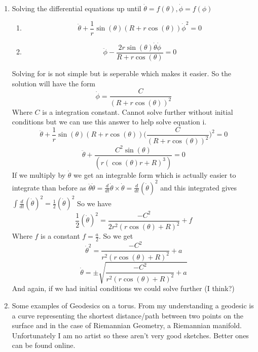 \documentclass[12pt]{article}
\begin{document}
\begin{enumerate}
\begin{enumerate}
\item Solving the differential equations up until $\dot{\theta} = f(\theta), \dot{\phi} = f(\phi)$
\begin{enumerate}
  \item $$ \ddot{\theta} + \frac{1}{r} \sin(\theta) ( R+ r \cos(\theta)) \dot{\phi}^2 = 0 $$
  \item $$ \ddot{\phi} - \frac{ 2 r \sin(\theta) \dot{\theta} \dot{\phi}}{R+ r \cos(\theta) } = 0 $$ 

\end{enumerate}
Solving for is not simple but is seperable which makes it easier. So the solution will have the form 
$$ \dot{\phi} = \frac{C}{(R+r \cos(\theta))^2} $$
Where $C$ is a integration constant. Cannot solve further without initial conditions but we can use this answer to help solve equation i. 
$$ \ddot{\theta} + \frac{1}{r} \sin(\theta) ( R+ r \cos(\theta)) \Big( \frac{C}{(R+r \cos(\theta))^2}\Big)^2 = 0 $$
$$ \ddot{\theta} + \frac{C^2 \sin(\theta)}{(r ( \cos(\theta) r + R) ^3 )} = 0 $$
If we multiply by $\dot{\theta}$ we get an integrable form which is actually easier to integrate than before as $\ddot{\theta} \dot{\theta} = \frac{d}{dt} \dot{\theta} \times \dot{\theta} = \frac{d}{dt} ( \dot{\theta})^2$ and this integrated gives $\int \frac{d}{dt} ( \dot{\theta})^2 = \frac{1}{2} ( \dot{\theta})^2 $ So we have 
$$ \frac{1}{2} ( \dot{\theta} )^2 = \frac{-C^2 }{2 r^2 ( r \cos(\theta) + R) ^2 } + f $$
Where $ f$ is a constant $f = \frac{a}{2}$. So we get 
$$ \dot{\theta}^2 = \frac{- C^2 }{r^2 ( r \cos(\theta) + R) ^2} + a $$
$$ \dot{\theta} = \pm \sqrt{\frac{-C^2 }{r^2 ( r \cos(\theta) + R)^2 }+ a} $$
And again, if we had initial conditions we could solve further (I think?) 

\item Some examples of Geodesics on a torus. From my understanding a geodesic is a curve representing the shortest distance/path between two points on the surface and in the case of Riemannian Geometry, a Riemannian manifold.
Unfortunately I am no artist so these aren't very good sketches. Better ones can be found online.
\begin{figure}[h!]
  

\end{figure}
\end{enumerate}
\end{enumerate}
\end{document}
